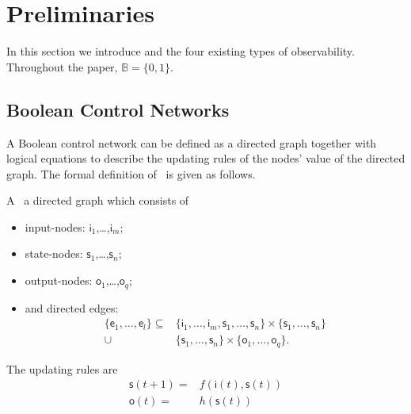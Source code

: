
\section{Preliminaries} 
\label{sec:pre}
In this section we introduce {\BCNs} and the four existing types of observability. Throughout the paper,  $\mathbb{B}=\{0,1\}$.

\subsection{Boolean Control Networks}

A Boolean control network can be defined as a directed graph together with logical equations to describe the updating rules of the nodes' value of the directed graph. The formal definition of \BCN\ is given as follows. 

\begin{definition} A \BCN\
	a directed graph which consists of 
	\begin{itemize}
	\item input-nodes: {$\mathsf{i}_1$,\ldots ,$\mathsf{i}_m$};
	\item state-nodes: {$\mathsf{s}_1$,\ldots ,$\mathsf{s}_n$};
	\item output-nodes: {$\mathsf{o}_1$,\ldots ,$\mathsf{o}_q$};
	\item and directed edges: 
		\begin{equation*}
			\begin{split}
				\{\mathsf{e}_1,\ldots,\mathsf{e}_l\}\subseteq & \{\mathsf{i}_1,\ldots ,\mathsf{i}_m,\mathsf{s}_1,\ldots ,\mathsf{s}_n\}\times \{\mathsf{s}_1,\ldots ,\mathsf{s}_n\} \\
				\cup & \{\mathsf{s}_1,\ldots ,\mathsf{s}_n\}\times\{\mathsf{o}_1,\ldots ,\mathsf{o}_q\}. 
			\end{split}
		\end{equation*}
	
\end{itemize}
	
The updating rules are
\begin{equation}
\begin{split}
\mathsf{s}(t+1)=&f(\mathsf{i}(t),\mathsf{s}(t))\\
\mathsf{o}(t)=&h(\mathsf{s}(t))
\end{split}
\label{equ:1}
\end{equation}
 \end{definition}

